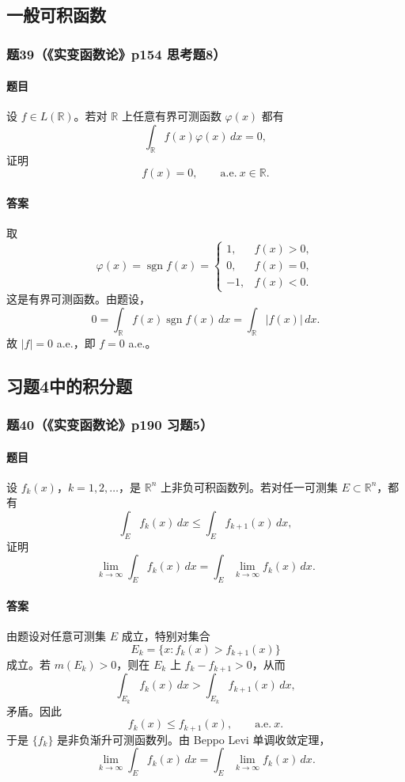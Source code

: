\documentclass{article}
\newcommand{\R}{\mathbb{R}}
\newcommand{\meas}{m}
\newcommand{\aee}{\text{a.e.}}
\begin{document}
	\subsection{一般可积函数}
	
	\subsubsection*{题39（《实变函数论》p154 思考题8）}
	\paragraph{题目}设 $f\in L(\R)$。若对 $\R$ 上任意有界可测函数 $\varphi(x)$ 都有
	\[
	\int_{\R}f(x)\varphi(x)\,dx=0,
	\]
	证明
	\[
	f(x)=0,
	\qquad \aee\ x\in\R.
	\]
	
	\paragraph{答案}取
	\[
	\varphi(x)=\operatorname{sgn} f(x)=
	\begin{cases}
		1,&f(x)>0,\\
		0,&f(x)=0,\\
		-1,&f(x)<0.
	\end{cases}
	\]
	这是有界可测函数。由题设，
	\[
	0=\int_{\R}f(x)\operatorname{sgn} f(x)\,dx
	=\int_{\R}|f(x)|\,dx.
	\]
	故 $|f|=0$ a.e.，即 $f=0$ a.e.。
	
	\subsection{习题4中的积分题}
	
	\subsubsection*{题40（《实变函数论》p190 习题5）}
	\paragraph{题目}设 $f_k(x)$，$k=1,2,\ldots$，是 $\R^n$ 上非负可积函数列。若对任一可测集 $E\subset\R^n$，都有
	\[
	\int_E f_k(x)\,dx\le\int_E f_{k+1}(x)\,dx,
	\]
	证明
	\[
	\lim_{k\to\infty}\int_E f_k(x)\,dx
	=
	\int_E \lim_{k\to\infty}f_k(x)\,dx.
	\]
	
	\paragraph{答案}由题设对任意可测集 $E$ 成立，特别对集合
	\[
	E_k=\{x:f_k(x)>f_{k+1}(x)
	\}
	\]
	成立。若 $\meas(E_k)>0$，则在 $E_k$ 上 $f_k-f_{k+1}>0$，从而
	\[
	\int_{E_k}f_k(x)\,dx>\int_{E_k}f_{k+1}(x)\,dx,
	\]
	矛盾。因此
	\[
	f_k(x)\le f_{k+1}(x),
	\qquad \aee\ x.
	\]
	于是 $\{f_k\}$ 是非负渐升可测函数列。由 Beppo Levi 单调收敛定理，
	\[
	\lim_{k\to\infty}\int_E f_k(x)\,dx
	=
	\int_E \lim_{k\to\infty}f_k(x)\,dx.
	\]
	
\end{document}
